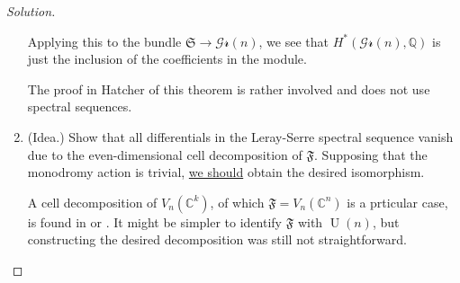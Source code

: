\begin{proof}[Solution]
\begin{enumerate}[label=\alph*.]
		Applying this to the bundle $\mathfrak{S}\to \mathcal{Gr}(n)$, we see that $H^{*}(\mathcal{Gr}(n),\mathbb{Q})$ is just the inclusion of the coefficients in the module.
				
\iffalse
			(Idea.) Corollary 2.2.2 in \cite{chark} suggests that the map $H^{*}(\mathcal{Gr}(n),\mathbb{Q})\longrightarrow H^{*}(\mathfrak{S},\mathbb{Q})$ may be seen as the inclusion of the $H^{*}(\mathcal{Gr}(n),\mathbb{Q})$-module summand associated to $1=x^0_{E}$ with respect to the isomorphism
			\begin{align*}
			H^{*}(\mathcal{Gr}(n),\mathbb{Q})\{1,x_{\mathfrak{S}},x_{\mathfrak{S}}^2,\ldots,x_{\mathfrak{S}}^{n-1}\} &\longrightarrow H^{*}(\mathfrak{S},\mathbb{Q})\\
			\sum_{i=0}^{d-1}y_i\cdot x^i_E&\longmapsto \sum_{i=0}^{d-1}p^*(y_i)\smile  x^i_E
 \end{align*}
 with $x_{\mathfrak{S}}$ the Euler class of the canonical bundle of $\mathcal{Gr}(n)$. The proof that this map is an isomorphism does not use spectral sequences, and the case for a non-compact base space is not included.
\fi

\begin{remark}
	The proof in Hatcher of this theorem is rather involved and does not use spectral sequences.
\end{remark}

\item (Idea.) Show that all differentials in the Leray-Serre spectral sequence vanish due to the even-dimensional cell decomposition of $\mathfrak{F}$. Supposing that the monodromy action is trivial, \href{https://mathoverflow.net/questions/338859/when-is-the-cohomology-of-a-fiber-bundle-a-tensor-product}{we should} obtain the desired isomorphism.

A cell decomposition of $V_n(\mathbb{C}^k)$, of which $\mathfrak{F}=V_n(\mathbb{C}^n)$ is a prticular case,  is found in \cite{moshtang} or \cite{james}. It might be simpler to identify $\mathfrak{F}$ with $\operatorname{U}(n)$, but constructing the desired decomposition was still not straightforward.
	\end{enumerate}
\end{proof}

\printbibliography


